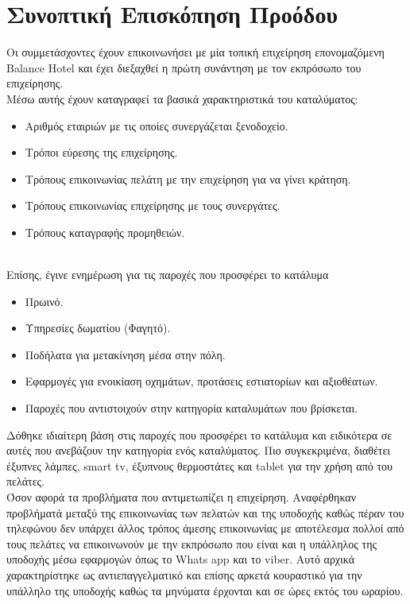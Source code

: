 \section{Συνοπτική Επισκόπηση Προόδου}
Οι συμμετάσχοντες έχουν επικοινωνήσει με μία τοπική επιχείρηση επονομαζόμενη \\Balance Hotel και έχει διεξαχθεί η πρώτη συνάντηση με τον εκπρόσωπο του επιχείρησης. \\

\noindent
Μέσω αυτής έχουν καταγραφεί τα βασικά χαρακτηριστικά του καταλύματος:
	\begin{itemize}
		\item Αριθμός εταιριών με τις οποίες συνεργάζεται ξενοδοχείο.
		\item Τρόποι εύρεσης της επιχείρησης. 
		\item Τρόπους επικοινωνίας πελάτη με την επιχείρηση για να γίνει κράτηση.
		\item Τρόπους επικοινωνίας επιχείρησης με τους συνεργάτες.
		\item Τρόπους καταγραφής προμηθειών.
	\end{itemize}

\hspace{1cm}\\
\noindent
Επίσης, έγινε ενημέρωση για τις παροχές που προσφέρει το κατάλυμα
\begin{itemize}
	\item Πρωινό.
	\item Υπηρεσίες δωματίου (Φαγητό).
 	\item Ποδήλατα για μετακίνηση μέσα στην πόλη.
 	\item Εφαρμογές για ενοικίαση οχημάτων, προτάσεις εστιατορίων και αξιοθέατων.
 	\item Παροχές που αντιστοιχούν στην κατηγορία καταλυμάτων που βρίσκεται.
\end{itemize} 

\noindent
Δόθηκε ιδιαίτερη βάση στις παροχές που προσφέρει το κατάλυμα και ειδικότερα σε αυτές που ανεβάζουν την κατηγορία ενός καταλύματος. Πιο συγκεκριμένα, διαθέτει έξυπνες λάμπες, smart tv, έξυπνους θερμοστάτες και tablet για την χρήση από του πελάτες.\\

\noindent
Όσον αφορά τα προβλήματα που αντιμετωπίζει η επιχείρηση. Αναφέρθηκαν προβλήματά μεταξύ της επικοινωνίας των πελατών και της υποδοχής καθώς πέραν του τηλεφώνου δεν υπάρχει άλλος τρόπος άμεσης επικοινωνίας με αποτέλεσμα πολλοί από τους πελάτες να επικοινωνούν με την εκπρόσωπο που είναι και η υπάλληλος της υποδοχής μέσω εφαρμογών όπως το Whats app και το viber. Αυτό αρχικά χαρακτηρίστηκε ως αντιεπαγγελματικό και επίσης αρκετά κουραστικό για την υπάλληλο της υποδοχής καθώς τα μηνύματα έρχονται και σε ώρες εκτός του ωραρίου. \\

